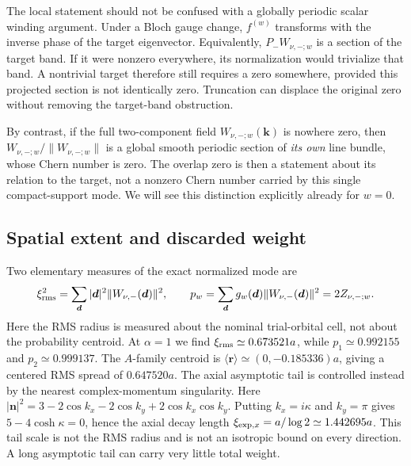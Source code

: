 \documentclass[aps,prb,onecolumn,nofootinbib,superscriptaddress]{revtex4-2}
\newcommand{\bk}{\boldsymbol k}
\newcommand{\br}{\boldsymbol r}
\newcommand{\bd}{\boldsymbol d}
\begin{document}
The local statement should not be confused with a globally periodic scalar
winding argument. Under a Bloch gauge change, $f^{(w)}$ transforms with the
inverse phase of the target eigenvector. Equivalently,
$P_-W_{\nu,-;w}$ is a section of the target band. If it were nonzero
everywhere, its normalization would trivialize that band. A nontrivial target
therefore still requires a zero somewhere, provided this projected section
is not identically zero. Truncation can displace the original zero without
removing the target-band obstruction.

By contrast, if the full two-component field $W_{\nu,-;w}(\bk)$ is nowhere
zero, then
$W_{\nu,-;w}/\|W_{\nu,-;w}\|$ is a global smooth periodic section of
\emph{its own} line bundle, whose Chern number is zero. The overlap zero is
then a statement about its relation to the target, not a nonzero Chern number
carried by this single compact-support mode. We will see this distinction
explicitly already for $w=0$.

\subsection{Spatial extent and discarded weight}

Two elementary measures of the exact normalized mode are
\begin{equation}
 \xi_{\rm rms}^2=\sum_{\bd}|\bd|^2\|W_{\nu,-}(\bd)\|^2,
 \qquad p_w=\sum_{\bd}g_w(\bd)\|W_{\nu,-}(\bd)\|^2=2Z_{\nu,-;w}.
 \label{eq:weight}
\end{equation}
Here the RMS radius is measured about the nominal trial-orbital cell, not
about the probability centroid. At $\alpha=1$ we find
$\xi_{\rm rms}\simeq0.673521a$, while $p_1\simeq0.992155$ and
$p_2\simeq0.999137$. The $A$-family centroid is
$\langle\br\rangle\simeq(0,-0.185336)a$, giving a centered RMS spread
of $0.647520a$. The axial asymptotic tail is controlled instead by the
nearest complex-momentum singularity. Here
$|\boldsymbol n|^2=3-2\cos k_x-2\cos k_y+2\cos k_x\cos k_y$.
Putting $k_x=i\kappa$ and $k_y=\pi$ gives
$5-4\cosh\kappa=0$, hence the axial decay length
$\xi_{{\rm exp},x}=a/\log2\simeq1.442695a$.
This tail scale is not the RMS radius and is not an isotropic bound on every
direction. A long asymptotic tail can carry very little total weight.
\end{document}
